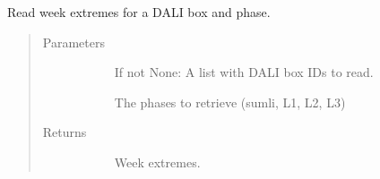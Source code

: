 \documentclass[letterpaper,10pt,english]{sphinxmanual}
\begin{document}
\begin{fulllineitems}
\label{\detokenize{autoapi/src/utils/snowflake/index:src.utils.snowflake.read_week_extremes}}
Read week extremes for a DALI box and phase.
\begin{quote}\begin{description}
\item[{Parameters}] \leavevmode\begin{description}
\item[{}] \leavevmode
If not None: A list with DALI box IDs to read.

\item[{}] \leavevmode
The phases to retrieve (sumli, L1, L2, L3)

\end{description}

\item[{Returns}] \leavevmode\begin{description}
\item[{}] \leavevmode
Week extremes.

\end{description}

\end{description}\end{quote}

\end{fulllineitems}


\begin{fulllineitems}
\label{\detokenize{autoapi/src/utils/snowflake/index:src.utils.snowflake.clear_forecasts}}
\end{fulllineitems}


\begin{fulllineitems}
\label{\detokenize{autoapi/src/utils/snowflake/index:src.utils.snowflake.write_forecasts}}
\end{fulllineitems}
\end{document}
